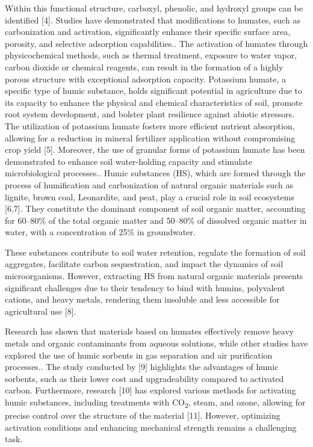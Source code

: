 Within this functional structure, carboxyl, phenolic, and hydroxyl
groups can be identified {[}4{]}. Studies have demonstrated that
modifications to humates, such as carbonization and activation,
significantly enhance their specific surface area, porosity, and
selective adsorption capabilities.. The activation of humates through
physicochemical methods, such as thermal treatment, exposure to water
vapor, carbon dioxide or chemical reagents, can result in the formation
of a highly porous structure with exceptional adsorption capacity.
Potassium humate, a specific type of humic substance, holds significant
potential in agriculture due to its capacity to enhance the physical and
chemical characteristics of soil, promote root system development, and
bolster plant resilience against abiotic stressors. The utilization of
potassium humate fosters more efficient nutrient absorption, allowing
for a reduction in mineral fertilizer application without compromising
crop yield {[}5{]}. Moreover, the use of granular forms of potassium
humate has been demonstrated to enhance soil water-holding capacity and
stimulate microbiological processes.. Humic substances (HS), which are
formed through the process of humification and carbonization of natural
organic materials such as lignite, brown coal, Leonardite, and peat,
play a crucial role in soil ecosystems {[}6,7{]}. They constitute the
dominant component of soil organic matter, accounting for 60--80\% of
the total organic matter and 50--80\% of dissolved organic matter in
water, with a concentration of 25\% in groundwater.

These substances contribute to soil water retention, regulate the
formation of soil aggregates, facilitate carbon sequestration, and
impact the dynamics of soil microorganisms. However, extracting HS from
natural organic materials presents significant challenges due to their
tendency to bind with humins, polyvalent cations, and heavy metals,
rendering them insoluble and less accessible for agricultural use
{[}8{]}.

Research has shown that materials based on humates effectively remove
heavy metals and organic contaminants from aqueous solutions, while
other studies have explored the use of humic sorbents in gas separation
and air purification processes.. The study conducted by {[}9{]}
highlights the advantages of humic sorbents, such as their lower cost
and upgradeability compared to activated carbon. Furthermore, research
{[}10{]} has explored various methods for activating humic substances,
including treatments with CO\textsubscript{2}, steam, and ozone,
allowing for precise control over the structure of the material
{[}11{]}. However, optimizing activation conditions and enhancing
mechanical strength remains a challenging task.

